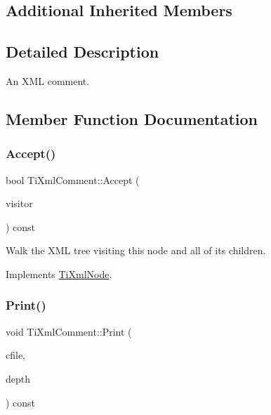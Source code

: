\subsection*{Additional Inherited Members}


\subsection{Detailed Description}
An X\+ML comment. 

\subsection{Member Function Documentation}
\mbox{\label{class_ti_xml_comment_ac894241530d1d266131a5026cb251a95}} 
\subsubsection{\texorpdfstring{Accept()}{Accept()}}
{\footnotesize\ttfamily bool Ti\+Xml\+Comment\+::\+Accept (\begin{DoxyParamCaption}\item[{\hyperlink{class_ti_xml_visitor}{Ti\+Xml\+Visitor} $\ast$}]{visitor }\end{DoxyParamCaption}) const\hspace{0.3cm}{\ttfamily [virtual]}}

Walk the X\+ML tree visiting this node and all of its children. 

Implements \hyperlink{class_ti_xml_node_acc0f88b7462c6cb73809d410a4f5bb86}{Ti\+Xml\+Node}.

\mbox{\label{class_ti_xml_comment_a873171beac19d40f0eaae945711c98ed}} 
\subsubsection{\texorpdfstring{Print()}{Print()}}
{\footnotesize\ttfamily void Ti\+Xml\+Comment\+::\+Print (\begin{DoxyParamCaption}\item[{F\+I\+LE $\ast$}]{cfile,  }\item[{int}]{depth }\end{DoxyParamCaption}) const\hspace{0.3cm}{\ttfamily [virtual]}}


